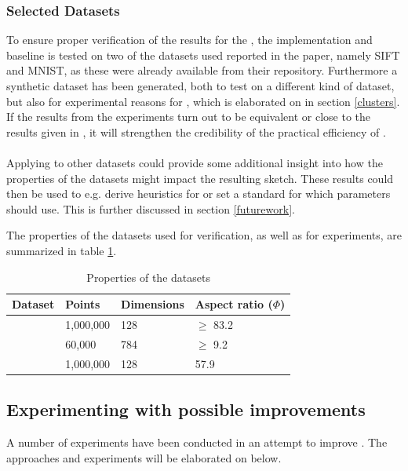\subsubsection{Selected Datasets}
\label{datasets}
To ensure proper verification of the results for the \qs{}, the implementation and baseline is tested on two of the datasets used reported in the paper, namely SIFT and MNIST, as these were already available from their repository. Furthermore a synthetic dataset has been generated, both to test \qs{} on a different kind of dataset, but also for experimental reasons for \qsr{}, which is elaborated on in section \ref{clusters}. If the results from the experiments turn out to be equivalent or close to the results given in \cite{wagner17}, it will strengthen the credibility of the practical efficiency of \qs{}.
\\
\\
Applying \qs{} to other datasets could provide some additional insight into how the properties of the datasets might impact the resulting sketch. These results could then be used to e.g. derive heuristics for \qs{} or set a standard for which parameters \qs{} should use. This is further discussed in section \ref{futurework}.

The properties of the datasets used for verification, as well as for experiments, are summarized in table \ref{tab:datasets}.

\begin{table}[h]
	\centering
	\begin{tabular}{l l l l}
		\hline
		Dataset & Points & Dimensions & Aspect ratio ($\Phi$) \\
		\hline
		\sift{} & 1,000,000 & 128 & $\geq$ 83.2 \\
		\mnist{} & 60,000 & 784 & $\geq$ 9.2 \\
		\clust{} & 1,000,000 & 128 & 57.9 \\
		\hline
	\end{tabular}
	\caption{Properties of the datasets}
	\label{tab:datasets}
\end{table}

\subsection{Experimenting with possible improvements}
\label{possible_improvements}
A number of experiments have been conducted in an attempt to improve \qs{}. The approaches and experiments will be elaborated on below.


